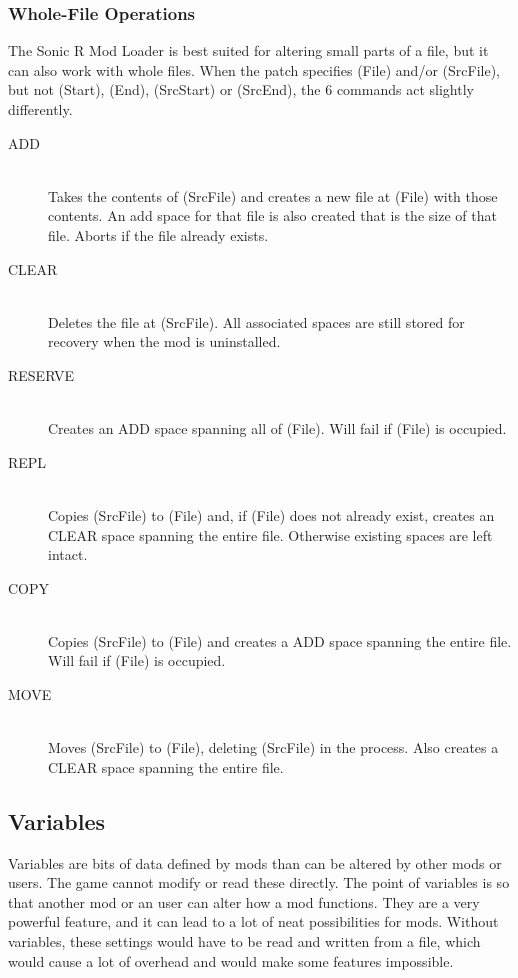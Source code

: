 \documentclass[12pt,a4paper,notitlepage]{article}
\begin{document}
\subsubsection{Whole-File Operations}
\label{subsubsec:works-patch-wholefile}
The Sonic R Mod Loader is best suited for altering small parts of a file, but it can also work with whole files. When the patch specifies (File) and/or (SrcFile), but not (Start), (End), (SrcStart) or (SrcEnd), the 6 commands act slightly differently.

\begin{description}
\item[ADD] \hfill \\ 
	Takes the contents of (SrcFile) and creates a new file at (File) with those contents. An add space for that file is also created that is the size of that file. Aborts if the file already exists.
\item[CLEAR] \hfill \\
	Deletes the file at (SrcFile). All associated spaces are still stored for recovery when the mod is uninstalled.
\item[RESERVE] \hfill \\
	Creates an ADD space spanning all of (File). Will fail if (File) is occupied.
\item[REPL] \hfill \\
	Copies (SrcFile) to (File) and, if (File) does not already exist, creates an CLEAR space spanning the entire file. Otherwise existing spaces are left intact.
\item[COPY] \hfill \\
	Copies (SrcFile) to (File) and creates a ADD space spanning the entire file. Will fail if (File) is occupied.
\item[MOVE] \hfill \\
	Moves (SrcFile) to (File), deleting (SrcFile) in the process. Also creates a CLEAR space spanning the entire file.
\end{description}

\subsection{Variables}
\label{subsec:works-var}
Variables are bits of data defined by mods than can be altered by other mods or users. The game cannot modify or read these directly. The point of variables is so that another mod or an user can alter how a mod functions. They are a very powerful feature, and it can lead to a lot of neat possibilities for mods. Without variables, these settings would have to be read and written from a file, which would cause a lot of overhead and would make some features impossible.
\end{document}

